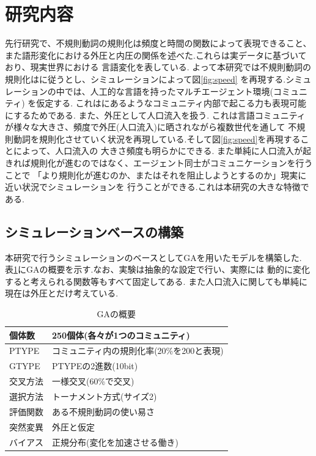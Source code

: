 \documentclass[10.5pt, a4j, twocolumn]{jsarticle}
\begin{document}
\section{研究内容}
先行研究\cite{Lieberman, scurve}で、不規則動詞の規則化は頻度と時間の関数によって表現できること、
また語形変化における外圧と内圧の関係を述べた.これらは実データに基づいており、現実世界における
言語変化を表している.
よって本研究では不規則動詞の規則化は\cite{Lieberman}に従うとし、シミュレーションによって図\ref{fig:speed}
を再現する.シミュレーションの中では、人工的な言語を持ったマルチエージェント環境(コミュニティ)
を仮定する.
これは\cite{scurve}にあるようなコミュニティ内部で起こる力も表現可能にするためである.
また、外圧として人口流入を扱う.
これは言語コミュニティが様々な大きさ、頻度で外圧(人口流入)に晒されながら複数世代を通して
不規則動詞を規則化させていく状況を再現している.そして図\ref{fig:speed}を再現することによって、人口流入の
大きさ頻度も明らかにできる.
また単純に人口流入が起きれば規則化が進むのではなく、エージェント同士がコミュニケーションを行うことで
「より規則化が進むのか、またはそれを阻止しようとするのか」現実に近い状況でシミュレーションを
行うことができる.これは本研究の大きな特徴である.

\subsection{シミュレーションベースの構築}\label{sec:abst}
本研究で行うシミュレーションのベースとしてGAを用いたモデルを構築した.
表\ref{tab:ga}にGAの概要を示す.なお、実験は抽象的な設定で行い、実際には
動的に変化すると考えられる関数等もすべて固定してある.
また人口流入に関しても単純に現在は外圧とだけ考えている.

{\small
\begin{table}[htbp]
 \centering
 \caption{GAの概要\label{tab:ga}}
\small
 \begin{tabular}{l||l}
  \hline 
   個体数 & 250個体(各々が1つのコミュニティ) \\
  \hline
  PTYPE & コミュニティ内の規則化率(20\%を200と表現) \\
  \hline
  GTYPE & PTYPEの2進数(10bit) \\
  \hline
  交叉方法 & 一様交叉(60\%で交叉) \\
  \hline
  選択方法 & トーナメント方式(サイズ2) \\
  \hline
  評価関数 & ある不規則動詞の使い易さ  \\
  \hline
  突然変異 & 外圧と仮定 \\
  \hline
  バイアス & 正規分布(変化を加速させる働き)\\
  \hline
\end{tabular}
\end{table}
}
\end{document}
